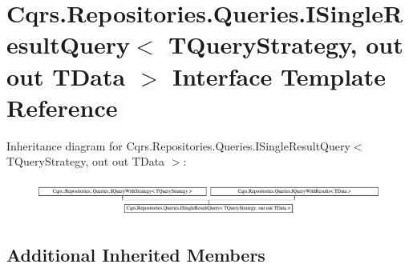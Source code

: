 \hypertarget{interfaceCqrs_1_1Repositories_1_1Queries_1_1ISingleResultQuery}{}\section{Cqrs.\+Repositories.\+Queries.\+I\+Single\+Result\+Query$<$ T\+Query\+Strategy, out out T\+Data $>$ Interface Template Reference}
\label{interfaceCqrs_1_1Repositories_1_1Queries_1_1ISingleResultQuery}
Inheritance diagram for Cqrs.\+Repositories.\+Queries.\+I\+Single\+Result\+Query$<$ T\+Query\+Strategy, out out T\+Data $>$\+:\begin{figure}[H]
\begin{center}
\leavevmode
\includegraphics[height=1.166667cm]{interfaceCqrs_1_1Repositories_1_1Queries_1_1ISingleResultQuery}
\end{center}
\end{figure}
\subsection*{Additional Inherited Members}
